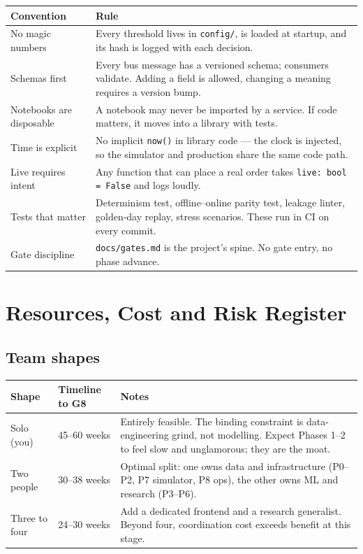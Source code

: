 \begin{longtable}{@{}p{3.8cm}p{10.8cm}@{}}
\toprule
\textbf{Convention} & \textbf{Rule}\\
\midrule
No magic numbers & Every threshold lives in \texttt{config/}, is loaded at
startup, and its hash is logged with each decision.\\
Schemas first & Every bus message has a versioned schema; consumers validate.
Adding a field is allowed, changing a meaning requires a version bump.\\
Notebooks are disposable & A notebook may never be imported by a service. If
code matters, it moves into a library with tests.\\
Time is explicit & No implicit \texttt{now()} in library code --- the clock is
injected, so the simulator and production share the same code path.\\
Live requires intent & Any function that can place a real order takes
\texttt{live: bool = False} and logs loudly.\\
Tests that matter & Determinism test, offline--online parity test, leakage
linter, golden-day replay, stress scenarios. These run in CI on every commit.\\
Gate discipline & \texttt{docs/gates.md} is the project's spine. No gate entry,
no phase advance.\\
\bottomrule
\end{longtable}

\chapter{Resources, Cost and Risk Register}

\section{Team shapes}

\begin{longtable}{@{}p{3.0cm}p{4.0cm}p{7.6cm}@{}}
\toprule
\textbf{Shape} & \textbf{Timeline to G8} & \textbf{Notes}\\
\midrule
Solo (you) & 45--60 weeks & Entirely feasible. The binding constraint is
data-engineering grind, not modelling. Expect Phases 1--2 to feel slow and
unglamorous; they are the moat.\\
Two people & 30--38 weeks & Optimal split: one owns data and infrastructure
(P0--P2, P7 simulator, P8 ops), the other owns ML and research (P3--P6).\\
Three to four & 24--30 weeks & Add a dedicated frontend and a research
generalist. Beyond four, coordination cost exceeds benefit at this stage.\\
\bottomrule
\end{longtable}


